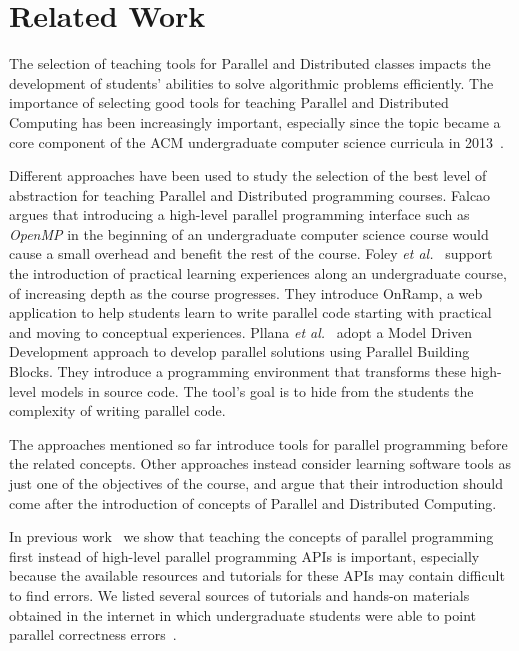 \section{Related Work}
\label{sec:relatedwork}


The selection of teaching tools for Parallel and Distributed classes impacts
the development of students' abilities to solve algorithmic problems
efficiently. The importance of selecting good tools for teaching Parallel and
Distributed Computing has been increasingly important, especially since the
topic became a core component of the ACM undergraduate computer science
curricula in 2013~\cite{acmcurricula}.

Different approaches have been used to study the selection of the best level of
abstraction for teaching Parallel and Distributed programming courses.
Falcao~\cite{6565518} argues that introducing a high-level parallel programming
interface such as \textit{OpenMP} in the beginning of an undergraduate computer
science course would cause a small overhead and benefit the rest of the course.
Foley \textit{et al.}~\cite{FOLEY2017138} support the introduction of practical
learning experiences along an undergraduate course, of increasing depth as the
course progresses. They introduce OnRamp, a web application to help students
learn to write parallel code starting with practical and moving to conceptual
experiences.  Pllana \textit{et al.}~\cite{Pllana:2009} adopt a Model Driven
Development approach to develop parallel solutions using Parallel Building
Blocks. They introduce a programming environment that transforms these
high-level models in source code. The tool's goal is to hide from the students
the complexity of writing parallel code.

The approaches mentioned so far introduce tools for parallel programming before
the related concepts.  Other approaches instead consider learning software
tools as just one of the objectives of the course, and argue that their
introduction should come after the introduction of concepts of Parallel and
Distributed Computing.

In previous work~\cite{goncalves:OpenMPNotEasy} we show that teaching the
concepts of parallel programming first instead of high-level parallel
programming APIs is important, especially because the available resources and
tutorials for these APIs may contain difficult to find errors.  We listed
several sources of tutorials and hands-on materials obtained in the internet in
which undergraduate students were able to point parallel correctness
errors~\cite{SuB:2005:CMO:1892830.1892863}.

